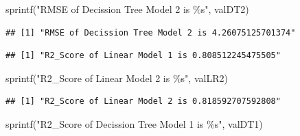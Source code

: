 \documentclass[
]{article}
\newenvironment{Shaded}{\begin{snugshade}}{\end{snugshade}}
\newcommand{\CommentTok}[1]{\textcolor[rgb]{0.56,0.35,0.01}{\textit{#1}}}
\newcommand{\FunctionTok}[1]{\textcolor[rgb]{0.00,0.00,0.00}{#1}}
\newcommand{\NormalTok}[1]{#1}
\newcommand{\OtherTok}[1]{\textcolor[rgb]{0.56,0.35,0.01}{#1}}
\newcommand{\SpecialCharTok}[1]{\textcolor[rgb]{0.00,0.00,0.00}{#1}}
\newcommand{\StringTok}[1]{\textcolor[rgb]{0.31,0.60,0.02}{#1}}
\begin{document}
\begin{Shaded}
\begin{Highlighting}[]
\FunctionTok{sprintf}\NormalTok{(}\StringTok{"RMSE of Decission Tree Model 2 is \%s"}\NormalTok{, valDT2)}
\end{Highlighting}
\end{Shaded}

\begin{verbatim}
## [1] "RMSE of Decission Tree Model 2 is 4.26075125701374"
\end{verbatim}

\begin{Shaded}
\end{Shaded}

\begin{verbatim}
## [1] "R2_Score of Linear Model 1 is 0.808512245475505"
\end{verbatim}

\begin{Shaded}
\begin{Highlighting}[]
\FunctionTok{sprintf}\NormalTok{(}\StringTok{"R2\_Score of Linear Model 2 is \%s"}\NormalTok{, valLR2)}
\end{Highlighting}
\end{Shaded}

\begin{verbatim}
## [1] "R2_Score of Linear Model 2 is 0.818592707592808"
\end{verbatim}

\begin{Shaded}
\begin{Highlighting}[]
\FunctionTok{sprintf}\NormalTok{(}\StringTok{"R2\_Score of Decission Tree Model 1 is \%s"}\NormalTok{, valDT1)}
\end{Highlighting}
\end{Shaded}
\end{document}
